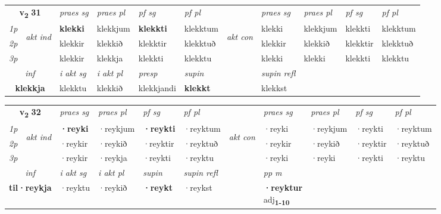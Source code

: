 \noindent
\begin{tabular}{lllllllllll} \toprule
\multicolumn{2}{c}{\textbf{v{\textsubscript{2}}} \Large{\textbf{31}}}  &  \textit{praes sg}  & \textit{praes pl}  &\textit{ pf sg} & \textit{pf pl} &  &  \textit{praes sg}  & \textit{praes pl}  & \textit{pf sg} & \textit{pf pl } \\*
	\cmidrule{3-6} \cmidrule{8-11}
 {\textit{1p}} & \multirow{3}{*}{\begin{turn}{90}\textit{akt ind}\end{turn}} & \textbf{klekki} & klekkjum & \textbf{klekkti} & klekktum & \multirow{3}{*}{\begin{turn}{90}\textit{akt con}\end{turn}} &klekki & klekkjum & klekkti & klekktum\\*
 {\textit{2p}} &  &  klekkir  & klekkið & klekktir & klekktuð & & klekkir & klekkið & klekktir & klekktuð \\*
{\textit{3p}} &  & klekkir & klekkja & klekkti & klekktu & & klekki & klekki& klekkti & klekktu \\*
\cmidrule{3-6} \cmidrule{8-11}

   \multicolumn{2}{c}{\textit{inf}}  & \textit{i akt sg} & \textit{i akt pl}   & \textit{presp} & \textit{supin} && \textit{supin refl}  \\*
  \multicolumn{2}{c}{\textbf{klekkja}} & klekktu  & klekkið   & klekkjandi &  \textbf{klekkt} && klekkst  \\*
\end{tabular}

\noindent
\begin{tabular}{lllllllllll} \toprule
\multicolumn{2}{c}{\textbf{v{\textsubscript{2}}} \Large{\textbf{32}}}  &  \textit{praes sg}  & \textit{praes pl}  &\textit{ pf sg} & \textit{pf pl} &  &  \textit{praes sg}  & \textit{praes pl}  & \textit{pf sg} & \textit{pf pl } \\*
	\cmidrule{3-6} \cmidrule{8-11}
 {\textit{1p}} & \multirow{3}{*}{\begin{turn}{90}\textit{akt ind}\end{turn}} & \textbf{·reyki} & ·reykjum & \textbf{·reykti} & ·reyktum & \multirow{3}{*}{\begin{turn}{90}\textit{akt con}\end{turn}} &·reyki & ·reykjum & ·reykti & ·reyktum\\*
 {\textit{2p}} &  &  ·reykir  & ·reykið & ·reyktir & ·reyktuð & & ·reykir & ·reykið & ·reyktir & ·reyktuð \\*
{\textit{3p}} &  & ·reykir & ·reykja & ·reykti & ·reyktu & & ·reyki & ·reyki& ·reykti & ·reyktu \\*
\cmidrule{3-6} \cmidrule{8-11}

   \multicolumn{2}{c}{\textit{inf}}  & \textit{i akt sg} & \textit{i akt pl}    & \textit{supin} & \textit{supin refl} && \textit{pp m} \\*
  \multicolumn{2}{c}{\textbf{til\allowbreak ·reykja}} & ·reyktu  & ·reykið    &  \textbf{·reykt} & ·reykst && \specialcell{\textbf{·reyktur} \\ adj\textbf{\textsubscript{1-10}}} \\*
\end{tabular}

